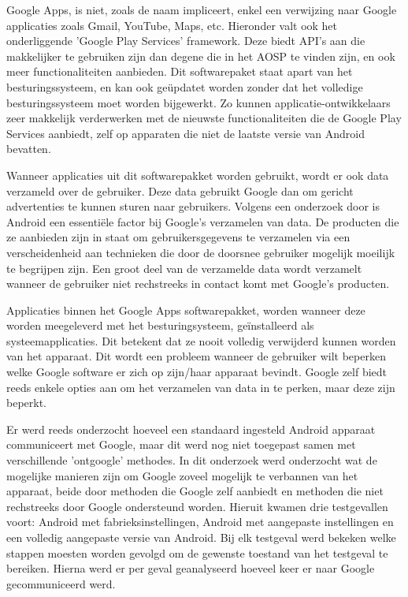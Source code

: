 Google Apps, is niet, zoals de naam impliceert, enkel een verwijzing naar Google applicaties zoals Gmail, YouTube, Maps, etc. Hieronder valt ook het onderliggende 'Google Play Services' framework. Deze biedt API's aan die makkelijker te gebruiken zijn dan degene die in het AOSP te vinden zijn, en ook meer functionaliteiten aanbieden. Dit softwarepaket staat apart van het besturingssysteem, en kan ook geüpdatet worden zonder dat het volledige besturingssysteem moet worden bijgewerkt. Zo kunnen applicatie-ontwikkelaars zeer makkelijk verderwerken met de nieuwste functionaliteiten die de Google Play Services aanbiedt, zelf op apparaten die niet de laatste versie van Android bevatten.

Wanneer applicaties uit dit softwarepakket worden gebruikt, wordt er ook data verzameld over de gebruiker. Deze data gebruikt Google dan om gericht advertenties te kunnen sturen naar gebruikers. Volgens een onderzoek door \cite{schmidt_google-data-collection} is Android een essentiële factor bij Google's verzamelen van data. De producten die ze aanbieden zijn in staat om gebruikersgegevens te verzamelen via een verscheidenheid aan technieken die door de doorsnee gebruiker mogelijk moeilijk te begrijpen zijn. Een groot deel van de verzamelde data wordt verzamelt wanneer de gebruiker niet rechstreeks in contact komt met Google's producten. 

Applicaties binnen het Google Apps softwarepakket, worden wanneer deze worden meegeleverd met het besturingsysteem, geïnstalleerd als systeemapplicaties. Dit betekent dat ze nooit volledig verwijderd kunnen worden van het apparaat. Dit wordt een probleem wanneer de gebruiker wilt beperken welke Google software er zich op zijn/haar apparaat bevindt. Google zelf biedt reeds enkele opties aan om het verzamelen van data in te perken, maar deze zijn beperkt.

Er werd reeds onderzocht hoeveel een standaard ingesteld Android apparaat communiceert met Google, maar dit werd nog niet toegepast samen met verschillende 'ontgoogle' methodes. In dit onderzoek werd onderzocht wat de mogelijke manieren zijn om Google zoveel mogelijk te verbannen van het apparaat, beide door methoden die Google zelf aanbiedt en methoden die niet rechstreeks door Google ondersteund worden. Hieruit kwamen drie testgevallen voort: Android met fabrieksinstellingen, Android met aangepaste instellingen en een volledig aangepaste versie van Android. Bij elk testgeval werd bekeken welke stappen moesten worden gevolgd om de gewenste toestand van het testgeval te bereiken. Hierna werd er per geval geanalyseerd hoeveel keer er naar Google gecommuniceerd werd. 

